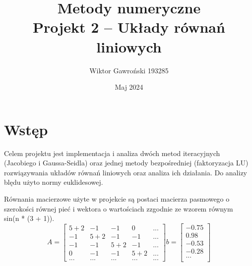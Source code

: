 \documentclass{article}
\title{
    Metody numeryczne\\
    Projekt 2 – Układy równań liniowych
}
\author{Wiktor Gawroński 193285}
\date{Maj 2024}
\begin{document}
\maketitle

\section{Wstęp}

Celem projektu jest implementacja i analiza dwóch metod iteracyjnych (Jacobiego i Gaussa-Seidla)
oraz jednej metody bezpośredniej (faktoryzacja LU) rozwiązywania układów równań liniowych oraz analiza ich działania.
Do analizy blędu użyto normy euklidesowej.

Równania macierzowe użyte w projekcie są postaci macierza pasmowego o szerokości równej pieć i wektora o wartościach zzgodnie ze wzorem równym \\
sin(n * (3 + 1)).\\
\[
A  =
\begin{bmatrix}
5 + 2 & -1    & -1    & 0     & ...  \\
-1    & 5 +2  & -1    & -1    & ...  \\
-1    & -1    & 5 + 2 & -1    & ...  \\        
0    & -1    & -1     & 5 + 2 & ...  \\   
...  &  ...  & ...    & ...   & ...  
\end{bmatrix}
b = 
\begin{bmatrix}
-0.75 \\
0.98 \\
-0.53 \\
-0.28 \\
... \\
\end{bmatrix}
\]
\newpage
\end{document}

